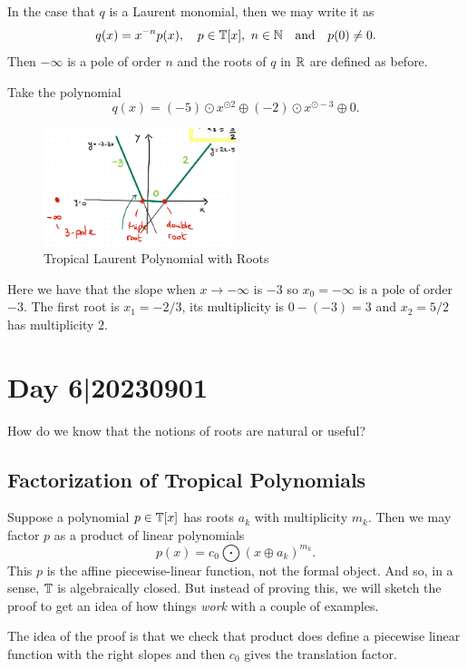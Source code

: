 \documentclass[12pt]{memoir}
\begin{document}

In the case that $q$ is a Laurent monomial, then we may write it as 
$$q(x)=x^{-n}p(x),\quad p\in\bT[x],\ n\in\bN\word{and}p(0)\neq 0.$$
Then $-\infty$ is a pole of order $n$ and the roots of $q$ in $\mathbb{R}$ are defined as before. 

\begin{Ex}
    Take the polynomial 
    $$q(x)=(-5)\odot x^{\odot 2}\oplus (-2)\odot x^{\odot -3}\oplus 0.$$
    \begin{figure}[h!]
        \centering
        \includegraphics[width=0.5\textwidth]{figs/fig5-7-TropicalLaurentPolynomial.png}
        \caption{Tropical Laurent Polynomial with Roots}
        \label{fig:5-7-TropicalLaurentPolynomial}
    \end{figure}
    Here we have that the slope when $x\to-\infty$ is $-3$ so $x_0=-\infty$ is a pole of order $-3$. The first root is $x_1=-2/3$, its multiplicity is $0-(-3)=3$ and $x_2=5/2$ has multiplicity $2$. 
\end{Ex}

\section{Day 6|20230901}%

How do we know that the notions of roots are natural or useful?

\subsection{Factorization of Tropical Polynomials}

Suppose a polynomial $p\in\mathbb{T}[x]$ has roots $a_k$ with multiplicity $m_k$. Then we may factor $p$ as a product of linear polynomials 
$$p(x)=c_0\bigodot(x\oplus a_k)^{m_k}.$$
This $p$ is the affine piecewise-linear function, not the formal object. And so, in a sense, $\mathbb{T}$ is algebraically closed. But instead of proving this, we will sketch the proof to get an idea of how things \emph{work} with a couple of examples.\par
The idea of the proof is that we check that product does define a piecewise linear function with the right slopes and then $c_0$ gives the translation factor.
\end{document}
